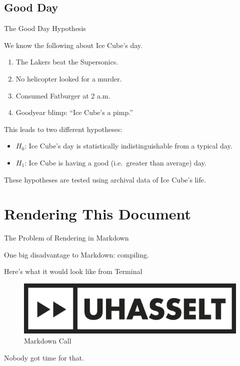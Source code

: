\documentclass[10pt,ignorenonframetext,]{beamer}
\providecommand{\tightlist}{%
  \setlength{\itemsep}{0pt}\setlength{\parskip}{0pt}}
\begin{document}
\hypertarget{good-day}{%
\subsection{Good Day}\label{good-day}}

\begin{frame}{The Good Day Hypothesis}
\protect\hypertarget{the-good-day-hypothesis}{}

We know the following about Ice Cube's day.

\begin{enumerate}
\tightlist
\item
  The Lakers beat the Supersonics.
\item
  No helicopter looked for a murder.
\item
  Consumed Fatburger at 2 a.m.
\item
  Goodyear blimp: ``Ice Cube's a pimp.''
\end{enumerate}

\bigskip This leads to two different hypotheses:

\begin{itemize}
\tightlist
\item
  \(H_0\): Ice Cube's day is statistically indistinguishable from a
  typical day.
\item
  \(H_1\): Ice Cube is having a good (i.e.~greater than average) day.
\end{itemize}

\bigskip These hypotheses are tested using archival data of Ice Cube's
life.

\end{frame}

\hypertarget{rendering-this-document}{%
\section{Rendering This Document}\label{rendering-this-document}}

\begin{frame}{The Problem of Rendering in Markdown}
\protect\hypertarget{the-problem-of-rendering-in-markdown}{}

One big disadvantage to Markdown: compiling.

\bigskip Here's what it would look like from Terminal \medskip

\begin{figure}
\centering
\includegraphics{uhasselt_logo.png}
\caption{Markdown Call}
\end{figure}

\bigskip Nobody got time for that.

\end{frame}
\end{document}
